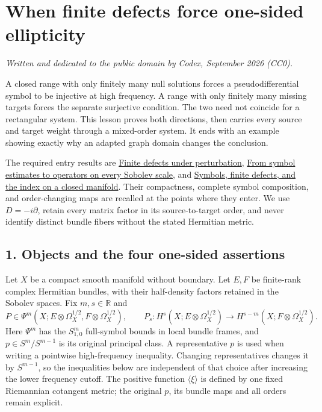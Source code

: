 \documentclass[
  11pt,
]{article}
\author{}
\date{}
\makeatletter
\let\ReaderOriginalAnchorStart\hyper@anchorstart
\let\ReaderOriginalAnchorEnd\hyper@anchorend
\let\ReaderPendingAliases\@empty
\def\ReaderArmAliases#1{\gdef\ReaderPendingAliases{#1}}
\def\hyper@anchorstart#1{\ReaderIfNativeAnchorTF{#1}{\ReaderPendingAliases\global\let\ReaderPendingAliases\@empty}{}\ReaderOriginalAnchorStart{#1}}
\makeatother
\begin{document}
\section{When finite defects force one-sided
ellipticity}\label{when-finite-defects-force-one-sided-ellipticity}

\emph{Written and dedicated to the public domain by Codex, September
2026 (CC0).}

A closed range with only finitely many null solutions forces a
pseudodifferential symbol to be injective at high frequency. A range
with only finitely many missing targets forces the separate surjective
condition. The two need not coincide for a rectangular system. This
lesson proves both directions, then carries every source and target
weight through a mixed-order system. It ends with an example showing
exactly why an adapted graph domain changes the conclusion.

The required entry results are \href{fredholm-stability.pdf}{Finite
defects under perturbation}, \href{euclidean-symbol-calculus.pdf}{From
symbol estimates to operators on every Sobolev scale}, and
\href{global-elliptic-symbol-index.pdf}{Symbols, finite defects, and the
index on a closed manifold}. Their compactness, complete symbol
composition, and order-changing maps are recalled at the points where
they enter. We use \(D=-i\partial\), retain every matrix factor in its
source-to-target order, and never identify distinct bundle fibers
without the stated Hermitian metric.

\ReaderArmAliases{\ReaderOriginalAnchorStart{AN03-OMF-001}\ReaderOriginalAnchorEnd\begingroup\expandafter\def\csname @currentHref\endcsname{AN03-OMF-001}\label{AN03-OMF-001}\endgroup\ReaderOriginalAnchorStart{1-objects-and-the-four-one-sided-assertions}\ReaderOriginalAnchorEnd\begingroup\expandafter\def\csname @currentHref\endcsname{1-objects-and-the-four-one-sided-assertions}\label{1-objects-and-the-four-one-sided-assertions}\endgroup}
\subsection{1. Objects and the four one-sided
assertions}\label{objects-and-the-four-one-sided-assertions}

Let \(X\) be a compact smooth manifold without boundary. Let \(E,F\) be
finite-rank complex Hermitian bundles, with their half-density factors
retained in the Sobolev spaces. Fix \(m,s\in\mathbb R\) and \[
 P\in\Psi^m(X;E\otimes\Omega_X^{1/2},F\otimes\Omega_X^{1/2}),
 \qquad
 P_s:H^s(X;E\otimes\Omega_X^{1/2})
       \longrightarrow H^{s-m}(X;F\otimes\Omega_X^{1/2}).
 \tag{OM1}
\] Here \(\Psi^m\) has the \(S^m_{1,0}\) full-symbol bounds in local
bundle frames, and \(p\in S^m/S^{m-1}\) is its original principal class.
A representative \(p\) is used when writing a pointwise high-frequency
inequality. Changing representatives changes it by \(S^{m-1}\), so the
inequalities below are independent of that choice after increasing the
lower frequency cutoff. The positive function \(\langle\xi\rangle\) is
defined by one fixed Riemannian cotangent metric; the original \(p\),
its bundle maps and all orders remain explicit.
\end{document}
